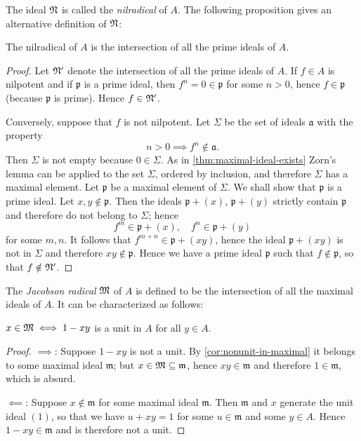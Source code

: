 The ideal $\mathfrak{N}$ is called the \emph{nilradical} of $A$. The following proposition gives an alternative definition of $\mathfrak{N}$:

\begin{proposition}\label{prop:nilradical-intersection}
The nilradical of $A$ is the intersection of all the prime ideals of $A$.
\end{proposition}

\begin{proof}
Let $\mathfrak{N}'$ denote the intersection of all the prime ideals of $A$. If $f \in A$ is nilpotent and if $\mathfrak{p}$ is a prime ideal, then $f^n = 0 \in \mathfrak{p}$ for some $n > 0$, hence $f \in \mathfrak{p}$ (because $\mathfrak{p}$ is prime). Hence $f \in \mathfrak{N}'$.

Conversely, suppose that $f$ is not nilpotent. Let $\Sigma$ be the set of ideals $\mathfrak{a}$ with the property
\[
    n > 0 \implies f^n \notin \mathfrak{a}.
\]
Then $\Sigma$ is not empty because $0 \in \Sigma$. As in \eqref{thm:maximal-ideal-exists} Zorn's lemma can be applied to the set $\Sigma$, ordered by inclusion, and therefore $\Sigma$ has a maximal element. Let $\mathfrak{p}$ be a maximal element of $\Sigma$. We shall show that $\mathfrak{p}$ is a prime ideal. Let $x, y \notin \mathfrak{p}$. Then the ideals $\mathfrak{p} + (x)$, $\mathfrak{p} + (y)$ strictly contain $\mathfrak{p}$ and therefore do not belong to $\Sigma$; hence
\[
    f^m \in \mathfrak{p} + (x), \quad f^n \in \mathfrak{p} + (y)
\]
for some $m, n$. It follows that $f^{m+n} \in \mathfrak{p} + (xy)$, hence the ideal $\mathfrak{p} + (xy)$ is not in $\Sigma$ and therefore $xy \notin \mathfrak{p}$. Hence we have a prime ideal $\mathfrak{p}$ such that $f \notin \mathfrak{p}$, so that $f \notin \mathfrak{N}'$.
\end{proof}

The \emph{Jacobson radical} $\mathfrak{M}$ of $A$ is defined to be the intersection of all the maximal ideals of $A$. It can be characterized as follows:

\begin{proposition}\label{prop:jacobson-radical}
$x \in \mathfrak{M} \iff 1 - xy$ is a unit in $A$ for all $y \in A$.
\end{proposition}

\begin{proof}
\noindent $\implies$: Suppose $1 - xy$ is not a unit. By \eqref{cor:nonunit-in-maximal} it belongs to some maximal ideal $\mathfrak{m}$; but $x \in \mathfrak{M} \subseteq \mathfrak{m}$, hence $xy \in \mathfrak{m}$ and therefore $1 \in \mathfrak{m}$, which is absurd.

$\impliedby$: Suppose $x \notin \mathfrak{m}$ for some maximal ideal $\mathfrak{m}$. Then $\mathfrak{m}$ and $x$ generate the unit ideal $(1)$, so that we have $u + xy = 1$ for some $u \in \mathfrak{m}$ and some $y \in A$. Hence $1 - xy \in \mathfrak{m}$ and is therefore not a unit.
\end{proof}


